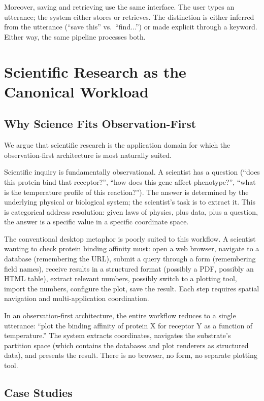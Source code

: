 \documentclass[11pt,a4paper]{article}
\theoremstyle{definition}
\theoremstyle{remark}
\begin{document}
Moreover, saving and retrieving use the same interface. The user types an utterance; the system either stores or retrieves. The distinction is either inferred from the utterance (``save this'' vs.\ ``find...'') or made explicit through a keyword. Either way, the same pipeline processes both.

\section{Scientific Research as the Canonical Workload}
\label{sec:science}

\subsection{Why Science Fits Observation-First}

We argue that scientific research is the application domain for which the observation-first architecture is most naturally suited.

Scientific inquiry is fundamentally observational. A scientist has a question (``does this protein bind that receptor?'', ``how does this gene affect phenotype?'', ``what is the temperature profile of this reaction?''). The answer is determined by the underlying physical or biological system; the scientist's task is to extract it. This is categorical address resolution: given laws of physics, plus data, plus a question, the answer is a specific value in a specific coordinate space.

The conventional desktop metaphor is poorly suited to this workflow. A scientist wanting to check protein binding affinity must: open a web browser, navigate to a database (remembering the URL), submit a query through a form (remembering field names), receive results in a structured format (possibly a PDF, possibly an HTML table), extract relevant numbers, possibly switch to a plotting tool, import the numbers, configure the plot, save the result. Each step requires spatial navigation and multi-application coordination.

In an observation-first architecture, the entire workflow reduces to a single utterance: ``plot the binding affinity of protein X for receptor Y as a function of temperature.'' The system extracts coordinates, navigates the substrate's partition space (which contains the databases and plot renderers as structured data), and presents the result. There is no browser, no form, no separate plotting tool.

\subsection{Case Studies}
\end{document}
